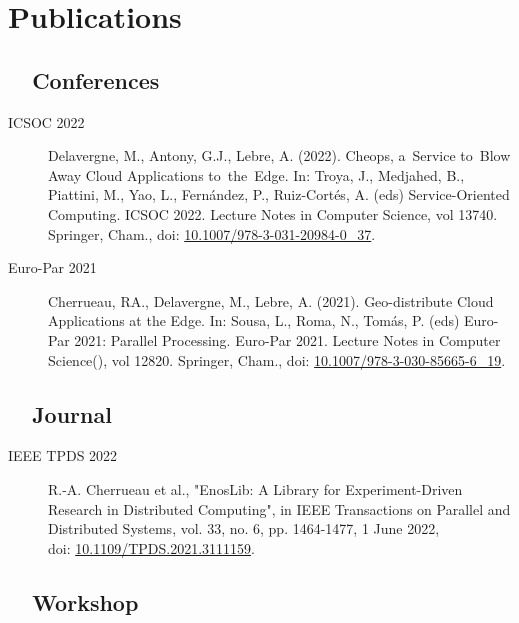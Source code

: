 \clearemptydoublepage
\chapter*{Publications}
\label{chap:publications}


\section*{\cloud~~Conferences}

\begin{description}
\item[ICSOC 2022] Delavergne, M., Antony, G.J., Lebre, A. (2022). Cheops, a Service to Blow Away Cloud Applications to the Edge. In: Troya, J., Medjahed, B., Piattini, M., Yao, L., Fernández, P., Ruiz-Cortés, A. (eds) Service-Oriented Computing. ICSOC 2022. Lecture Notes in Computer Science, vol 13740. Springer, Cham., doi: \href{https://doi.org/10.1007/978-3-031-20984-0_37}{10.1007/978-3-031-20984-0\_37}.
\item[Euro-Par 2021] Cherrueau, RA., Delavergne, M., Lebre, A. (2021). Geo-distribute Cloud Applications at the Edge. In: Sousa, L., Roma, N., Tomás, P. (eds) Euro-Par 2021: Parallel Processing. Euro-Par 2021. Lecture Notes in Computer Science(), vol 12820. Springer, Cham., doi: \href{https://doi.org/10.1007/978-3-030-85665-6_19}{10.1007/978-3-030-85665-6\_19}.
\end{description}


\section*{\cloud~~Journal}


\begin{description}
\item[IEEE TPDS 2022] R.-A. Cherrueau et al., "EnosLib: A Library for Experiment-Driven Research in Distributed Computing", in IEEE Transactions on Parallel and Distributed Systems, vol. 33, no. 6, pp. 1464-1477, 1 June 2022, \\ doi: \href{https://doi.org/10.1109/TPDS.2021.3111159}{10.1109/TPDS.2021.3111159}.
\end{description}



\section*{\cloud~~Workshop}


